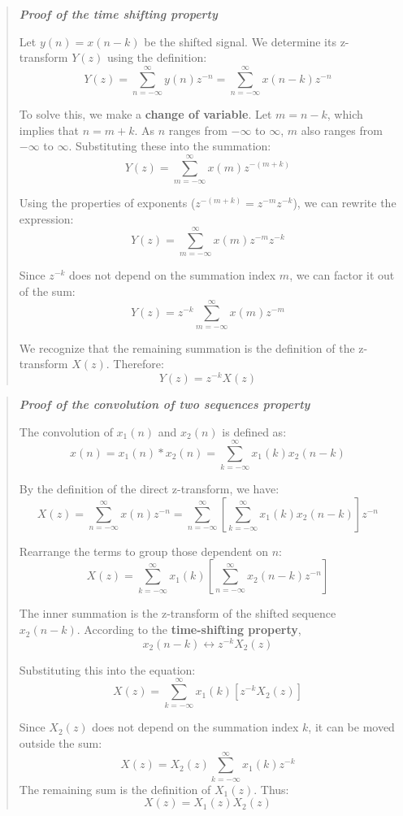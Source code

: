 \begin{quote}
\textbf{\emph{Proof of the time shifting property}}

Let \(y(n) = x(n - k)\) be the shifted signal. We determine its
z-transform \(Y(z)\) using the definition:
\[Y(z) = \sum_{n=-\infty}^{\infty} y(n)z^{-n} = \sum_{n=-\infty}^{\infty} x(n - k)z^{-n}\]

To solve this, we make a \textbf{change of variable}. Let
\textbf{\(m = n - k\)}, which implies that \textbf{\(n = m + k\)}. As
\(n\) ranges from \(-\infty\) to \(\infty\), \(m\) also ranges from
\(-\infty\) to \(\infty\). Substituting these into the summation:
\[Y(z) = \sum_{m=-\infty}^{\infty} x(m)z^{-(m+k)}\]

Using the properties of exponents (\(z^{-(m+k)} = z^{-m}z^{-k}\)), we
can rewrite the expression:
\[Y(z) = \sum_{m=-\infty}^{\infty} x(m)z^{-m}z^{-k}\]

Since \(z^{-k}\) does not depend on the summation index \(m\), we can
factor it out of the sum:
\[Y(z) = z^{-k} \sum_{m=-\infty}^{\infty} x(m)z^{-m}\]

We recognize that the remaining summation is the definition of the
z-transform \(X(z)\). Therefore: \textbf{\[Y(z) = z^{-k}X(z)\]}
\end{quote}

\begin{quote}
\textbf{\emph{Proof of the convolution of two sequences property}}

The convolution of \(x_1(n)\) and \(x_2(n)\) is defined as:
\[x(n) = x_1(n) * x_2(n) = \sum_{k=-\infty}^{\infty} x_1(k)x_2(n-k)\]

By the definition of the direct z-transform, we have:
\[X(z) = \sum_{n=-\infty}^{\infty} x(n)z^{-n} = \sum_{n=-\infty}^{\infty} \left[ \sum_{k=-\infty}^{\infty} x_1(k)x_2(n-k) \right] z^{-n}\]

Rearrange the terms to group those dependent on \(n\):
\[X(z) = \sum_{k=-\infty}^{\infty} x_1(k) \left[ \sum_{n=-\infty}^{\infty} x_2(n-k)z^{-n} \right]\]

The inner summation is the z-transform of the shifted sequence
\(x_2(n - k)\). According to the \textbf{time-shifting property},
\[x_2(n - k) \leftrightarrow z^{-k}X_2(z)\]

Substituting this into the equation:
\[X(z) = \sum_{k=-\infty}^{\infty} x_1(k) \left[ z^{-k}X_2(z) \right]\]

Since \(X_2(z)\) does not depend on the summation index \(k\), it can be
moved outside the sum:
\[X(z) = X_2(z) \sum_{k=-\infty}^{\infty} x_1(k)z^{-k}\] The remaining
sum is the definition of \(X_1(z)\). Thus:
\textbf{\[X(z) = X_1(z)X_2(z)\]}
\end{quote}

